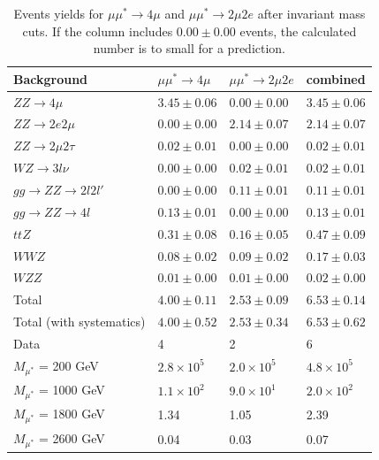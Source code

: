 \begin{table}[h!]
\begin{center}
\begin{tabular}{|l|l|l|l|}
\hline 
Background & $\mu\mu^{*}\rightarrow 4\mu$ & $\mu\mu^{*}\rightarrow 2\mu 2e$ & combined \\ 
\hline
$ZZ \rightarrow 4\mu$ & $3.45\pm 0.06$ & $0.00\pm 0.00$ & $3.45\pm 0.06$ \\
$ZZ \rightarrow 2e 2\mu$ & $0.00\pm 0.00$ & $2.14\pm 0.07$ & $2.14\pm 0.07$\\
$ZZ \rightarrow 2\mu 2\tau$ & $0.02\pm 0.01$ & $0.00\pm 0.00$ & $0.02\pm 0.01$\\
$WZ \rightarrow 3l \nu$ & $0.00\pm 0.00$ & $0.02\pm 0.01$ & $0.02\pm 0.01$\\
$gg \rightarrow ZZ \rightarrow 2l2l'$ & $0.00\pm 0.00$ & $0.11\pm 0.01$ & $0.11\pm 0.01$\\
$gg \rightarrow ZZ \rightarrow 4l$ & $0.13\pm 0.01$ & $0.00\pm 0.00$ & $0.13\pm 0.01$\\
$ttZ$ & $0.31\pm 0.08$ & $0.16\pm 0.05$ & $0.47\pm 0.09$\\
$WWZ$ & $0.08\pm 0.02$ & $0.09\pm 0.02$ & $0.17\pm 0.03$\\
$WZZ$ & $0.01\pm 0.00$ & $0.01\pm 0.00$ & $0.02\pm 0.00$\\
\hline
Total & $4.00\pm 0.11$ & $2.53\pm 0.09$ & $6.53\pm 0.14$\\
Total (with systematics) & $4.00\pm 0.52$ & $2.53\pm 0.34$ & $6.53\pm 0.62$\\
\hline
\hline
Data & 4 & 2 & 6\\
\hline
\hline
$M_{\mu^{*}}$ = 200 GeV & $2.8 \times 10^{5}$ & $2.0 \times 10^{5}$ & $4.8 \times 10^{5}$\\
$M_{\mu^{*}}$ = 1000 GeV & $1.1 \times 10^{2}$ & $9.0 \times 10^{1}$ & $2.0 \times 10^{2}$\\
$M_{\mu^{*}}$ = 1800 GeV & 1.34 & 1.05 & 2.39\\
$M_{\mu^{*}}$ = 2600 GeV & 0.04 & 0.03 & 0.07\\
\hline
\end{tabular}
\end{center}
\caption{\label{tab:yieldsmustarZ}Events yields for $\mu\mu^{*}\rightarrow 4\mu$ and $\mu\mu^{*}\rightarrow 2\mu 2e$ after invariant mass cuts. If the column includes $0.00 \pm 0.00$ events, the calculated number is to small for a prediction.}
\end{table}


